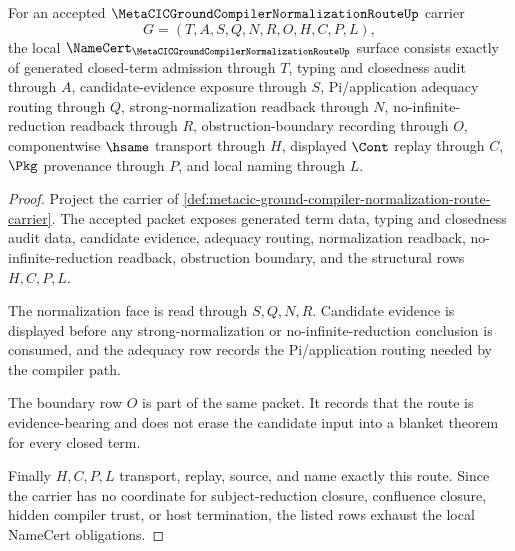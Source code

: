 \begin{theorem}
\label{thm:metacic-ground-compiler-normalization-route-namecert-obligations}
For an accepted $\MetaCICGroundCompilerNormalizationRouteUp$ carrier
$$
G=(T,A,S,Q,N,R,O,H,C,P,L),
$$
the local $\NameCert_{\MetaCICGroundCompilerNormalizationRouteUp}$ surface consists exactly of generated closed-term admission through $T$, typing and closedness audit through $A$, candidate-evidence exposure through $S$, Pi/application adequacy routing through $Q$, strong-normalization readback through $N$, no-infinite-reduction readback through $R$, obstruction-boundary recording through $O$, componentwise $\hsame$ transport through $H$, displayed $\Cont$ replay through $C$, $\Pkg$ provenance through $P$, and local naming through $L$.
\end{theorem}
\begin{proof}
Project the carrier of \autoref{def:metacic-ground-compiler-normalization-route-carrier}. The accepted packet exposes generated term data, typing and closedness audit data, candidate evidence, adequacy routing, normalization readback, no-infinite-reduction readback, obstruction boundary, and the structural rows $H,C,P,L$.

The normalization face is read through $S,Q,N,R$. Candidate evidence is displayed before any strong-normalization or no-infinite-reduction conclusion is consumed, and the adequacy row records the Pi/application routing needed by the compiler path.

The boundary row $O$ is part of the same packet. It records that the route is evidence-bearing and does not erase the candidate input into a blanket theorem for every closed term.

Finally $H,C,P,L$ transport, replay, source, and name exactly this route. Since the carrier has no coordinate for subject-reduction closure, confluence closure, hidden compiler trust, or host termination, the listed rows exhaust the local NameCert obligations.
\end{proof}


